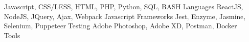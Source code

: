 \begin{cventries}
  \cventry
    {Javascript, CSS/LESS, HTML, PHP, Python, SQL, BASH}
    {Languages}
    {}
    {}
    {}
  \cventry
    {ReactJS, NodeJS, JQuery, Ajax, Webpack}
    {Javascript Frameworks}
    {}
    {}
    {}
  \cventry
    {Jest, Enzyme, Jasmine, Selenium, Puppeteer}
    {Testing}
    {}
    {}
    {}
  \cventry
    {Adobe Photoshop, Adobe XD, Postman, Docker}
    {Tools}
    {}
    {}
    {}
\end{cventries}